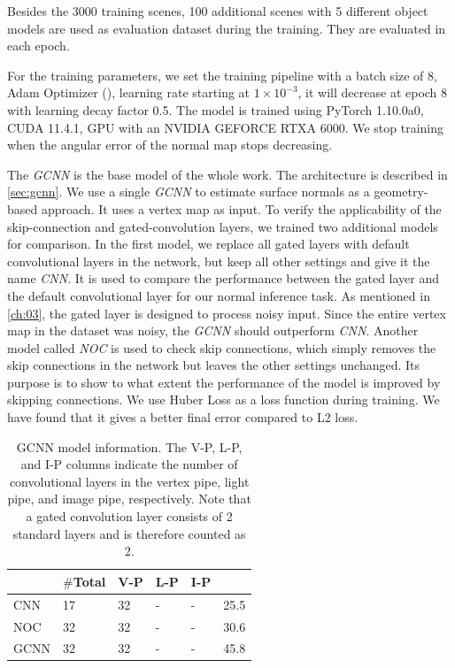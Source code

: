 Besides the 3000 training scenes, 100 additional scenes with 5 different object models are used as evaluation dataset during the training. They are evaluated in each epoch. 

For the training parameters, we set the training pipeline with a batch size of 8, Adam Optimizer (\cite{adam}), learning rate starting at $ 1\times10^{-3} $, it will decrease at epoch 8 with learning decay factor 0.5. The model is trained using PyTorch 1.10.0a0, CUDA 11.4.1, GPU with an NVIDIA GEFORCE RTXA 6000. We stop training when the angular error of the normal map stops decreasing.

The \textit{GCNN} is the base model of the whole work. The architecture is described in \ref{sec:gcnn}. We use a single \textit{GCNN} to estimate surface normals as a geometry-based approach. It uses a vertex map as input. To verify the applicability of the skip-connection and gated-convolution layers, we trained two additional models for comparison. 
In the first model, we replace all gated layers with default convolutional layers in the network, but keep all other settings and give it the name \textit{CNN}. It is used to compare the performance between the gated layer and the default convolutional layer for our normal inference task. As mentioned in \ref{ch:03}, the gated layer is designed to process noisy input. Since the entire vertex map in the dataset was noisy, the \textit{GCNN} should outperform \textit{CNN}. 
Another model called \textit{NOC} is used to check skip connections, which simply removes the skip connections in the network but leaves the other settings unchanged. Its purpose is to show to what extent the performance of the model is improved by skipping connections. We use Huber Loss as a loss function during training. We have found that it gives a better final error compared to L2 loss. 



\begin{table}[H]
	\centering
	\captionsetup{width=\linewidth}
	\begin{tabular}{l | l l l l l }
		\toprule
		\tabhead{Model} & $ \# $\textbf{Total} &\textbf{ V-P} & \textbf{L-P} & \textbf{I-P} & \tabhead{Size /MB}\\
		\midrule
		\hline
		CNN 					& 17 & 32 & - & - & 25.5 \\
		\hline
		NOC 					& 32 & 32 & - & - & 30.6 \\
		\hline
		GCNN 					& 32 & 32 & - & - & 45.8 \\
		\bottomrule
	\end{tabular}
	\caption{GCNN model information. The V-P, L-P, and I-P columns indicate the number of convolutional layers in the vertex pipe, light pipe, and image pipe, respectively. Note that a gated convolution layer consists of 2 standard layers and is therefore counted as 2.}	
	\label{tab:gcnn-eval-mean}
\end{table}


